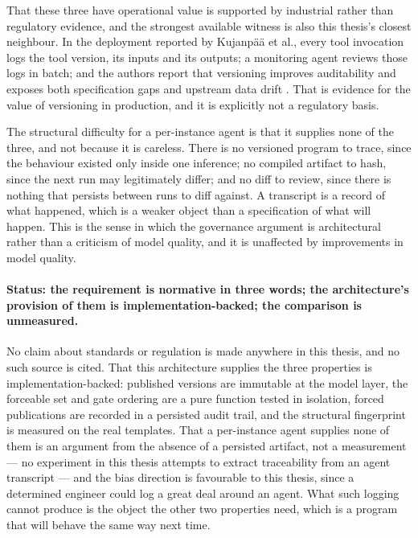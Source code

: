 That these three have operational value is supported by industrial rather than regulatory
evidence, and the strongest available witness is also this thesis's closest neighbour. In the
deployment reported by Kujanpää et al., every tool invocation logs the tool version, its
inputs and its outputs; a monitoring agent reviews those logs in batch; and the authors report
that versioning improves auditability and exposes both specification gaps and upstream data
drift \cite{kujanpaa2026toolmaking}. That is evidence for the value of versioning in
production, and it is explicitly not a regulatory basis.

The structural difficulty for a per-instance agent is that it supplies none of the three, and
not because it is careless. There is no versioned program to trace, since the behaviour existed
only inside one inference; no compiled artifact to hash, since the next run may legitimately
differ; and no diff to review, since there is nothing that persists between runs to diff
against. A transcript is a record of what happened, which is a weaker object than a
specification of what will happen. This is the sense in which the governance argument is
architectural rather than a criticism of model quality, and it is unaffected by improvements in
model quality.

\paragraph{Status: the requirement is normative in three words; the architecture's provision of
them is implementation-backed; the comparison is unmeasured.}
No claim about standards or regulation is made anywhere in this thesis, and no such source is
cited. That this architecture supplies the three properties is implementation-backed: published
versions are immutable at the model layer, the forceable set and gate ordering are a pure
function tested in isolation, forced publications are recorded in a persisted audit trail, and
the structural fingerprint is measured on the real templates. That a per-instance agent supplies
none of them is an argument from the absence of a persisted artifact, not a measurement --- no
experiment in this thesis attempts to extract traceability from an agent transcript --- and the
bias direction is favourable to this thesis, since a determined engineer could log a great deal
around an agent. What such logging cannot produce is the object the other two properties need,
which is a program that will behave the same way next time.


